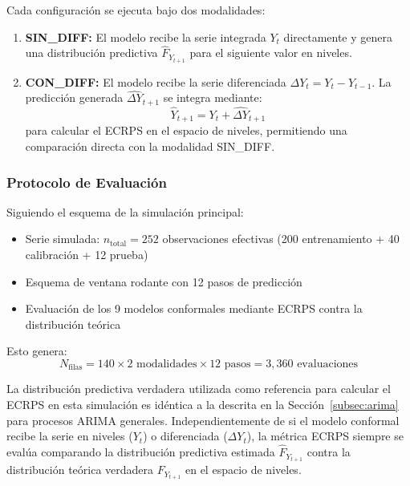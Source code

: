 Cada configuración se ejecuta bajo dos modalidades:

\begin{enumerate}
\item \textbf{SIN\_DIFF:} El modelo recibe la serie integrada $Y_t$ directamente y genera una distribución predictiva $\hat{F}_{Y_{t+1}}$ para el siguiente valor en niveles.

\item \textbf{CON\_DIFF:} El modelo recibe la serie diferenciada $\Delta Y_t = Y_t - Y_{t-1}$. La predicción generada $\widehat{\Delta Y}_{t+1}$ se integra mediante:
\begin{equation}
\hat{Y}_{t+1} = Y_t + \widehat{\Delta Y}_{t+1}
\end{equation}
para calcular el ECRPS en el espacio de niveles, permitiendo una comparación directa con la modalidad SIN\_DIFF.
\end{enumerate}

\subsubsection{Protocolo de Evaluación}

Siguiendo el esquema de la simulación principal:
\begin{itemize}
\item Serie simulada: $n_{\text{total}} = 252$ observaciones efectivas (200 entrenamiento + 40 calibración + 12 prueba)
\item Esquema de ventana rodante con 12 pasos de predicción
\item Evaluación de los 9 modelos conformales mediante ECRPS contra la distribución teórica
\end{itemize}

Esto genera:
\begin{equation}
N_{\text{filas}} = 140 \times 2 \text{ modalidades} \times 12 \text{ pasos} = 3{,}360 \text{ evaluaciones}
\end{equation}

La distribución predictiva verdadera utilizada como referencia para calcular el ECRPS en esta simulación es idéntica a la descrita en la Sección~\ref{subsec:arima} para procesos ARIMA generales. Independientemente de si el modelo conformal recibe la serie en niveles ($Y_t$) o diferenciada ($\Delta Y_t$), la métrica ECRPS siempre se evalúa comparando la distribución predictiva estimada $\hat{F}_{Y_{t+1}}$ contra la distribución teórica verdadera $F_{Y_{t+1}}$ en el espacio de niveles.


